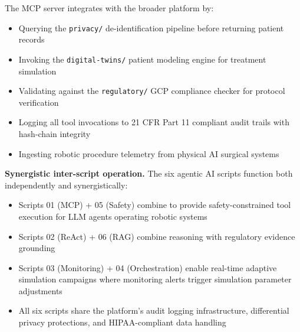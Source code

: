The MCP server integrates with the broader platform by:
\begin{itemize}
  \item Querying the \texttt{privacy/} de-identification pipeline before returning patient records
  \item Invoking the \texttt{digital-twins/} patient modeling engine for treatment simulation
  \item Validating against the \texttt{regulatory/} GCP compliance checker for protocol verification
  \item Logging all tool invocations to 21 CFR Part 11 compliant audit trails with hash-chain integrity
  \item Ingesting robotic procedure telemetry from physical AI surgical systems
\end{itemize}

\textbf{Synergistic inter-script operation.} The six agentic AI scripts function both independently and synergistically:
\begin{itemize}
  \item Scripts 01 (MCP) + 05 (Safety) combine to provide safety-constrained tool execution for LLM agents operating robotic systems
  \item Scripts 02 (ReAct) + 06 (RAG) combine reasoning with regulatory evidence grounding
  \item Scripts 03 (Monitoring) + 04 (Orchestration) enable real-time adaptive simulation campaigns where monitoring alerts trigger simulation parameter adjustments
  \item All six scripts share the platform's audit logging infrastructure, differential privacy protections, and HIPAA-compliant data handling
\end{itemize}

